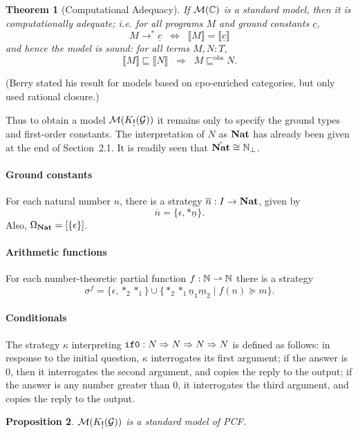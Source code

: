 \documentclass[11pt]{article}
\newtheorem{theorem}{Theorem}[section]
\newtheorem{proposition}[theorem]{Proposition}
\newcommand{\Mod}{{\cal M}}
\newcommand{\Nat}{{\bf Nat}}
\newcommand{\Eqdef}{\succeq}
\newcommand{\Pfr}{\rightharpoonup}
\newcommand{\ofcourse}{\mbox{$!$}}
\newcommand{\KG}{K_{\ofcourse }({\cal G})}
\begin{document}
\begin{theorem}[Computational Adequacy]
If $\Mod ({\Bbb C})$ is a standard model, then it is computationally
adequate; {\em i.e.} for all programs $M$ and ground constants $\underline{c}$,
\[ M \longrightarrow^{\ast} \underline{c} \;\; \Longleftrightarrow \;\;
\llbracket M \rrbracket = \llbracket \underline{c} \rrbracket \]
and hence the model is {\em sound}: for all terms $M, N : T$,
\[ \llbracket M \rrbracket \sqsubseteq \llbracket N \rrbracket \;\;
\Longrightarrow \;\; M \sqsubseteq^{\mbox{obs}} N . \]
\end{theorem}
(Berry stated his result for models based on cpo-enriched categories,
but only used rational closure.)

Thus to obtain a model $\Mod (\KG )$ it remains only to specify the
ground types and first-order constants.
The interpretation of $N$ as $\Nat$ has already been given at the
end of Section~2.1. It is readily seen that $\hat{\Nat} \cong {\Bbb N}_{\bot}$.

\paragraph{Ground constants}
For each natural number $n$, there is a strategy $\overline{n} : I \rightarrow
\Nat$, given by
\[ \overline{n} = \{ \epsilon , \ast \underline{n} \} . \]
Also, $\Omega_{\Nat} = [\{\epsilon \} ]$.

\paragraph{Arithmetic functions}
For each number-theoretic partial function $f : {\Bbb N} \Pfr {\Bbb N}$
there is a strategy
\[ \sigma^{f} = \{ \epsilon , \ast_{2}\ast_{1} \} \cup
\{ \ast_{2}\ast_{1}\underline{n}_{1}\underline{m}_{2} \mid
f(n) \Eqdef m \} . \]


\paragraph{Conditionals}
The strategy $\kappa$ interpreting ${\tt if0} : N \Rightarrow N \Rightarrow
N \Rightarrow N$ is defined as follows:
in response to the initial question, $\kappa$ interrogates its first
argument;
if the answer is 0, then it interrogates the second argument, and copies the
reply to the output; if the answer is any number greater than 0, it interrogates
the third argument, and copies the reply to the output.

\begin{proposition}
$\Mod (\KG )$ is a standard model of PCF.
\end{proposition}
\end{document}
